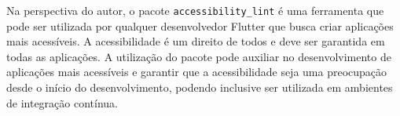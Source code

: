Na perspectiva do autor, o pacote \texttt{accessibility\_lint} é uma ferramenta que pode ser utilizada por qualquer desenvolvedor Flutter que busca criar aplicações mais acessíveis. A acessibilidade é um direito de todos e deve ser garantida em todas as aplicações. A utilização do pacote pode auxiliar no desenvolvimento de aplicações mais acessíveis e garantir que a acessibilidade seja uma preocupação desde o início do desenvolvimento, podendo inclusive ser utilizada em ambientes de integração contínua.